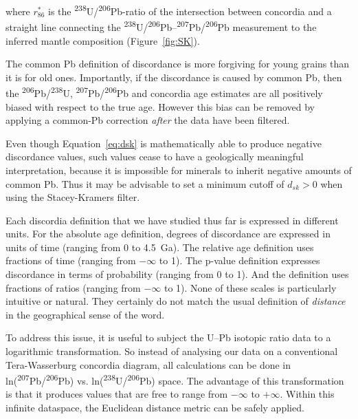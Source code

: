 \documentclass[gchron, manuscript]{copernicus}
\begin{document}
\noindent where $r_{86}^\ast$ is the
\textsuperscript{238}U/\textsuperscript{206}Pb-ratio of the
intersection between concordia and a straight line connecting the
\textsuperscript{238}U/\textsuperscript{206}Pb--\textsuperscript{207}Pb/\textsuperscript{206}Pb
measurement to the inferred mantle composition (Figure~\ref{fig:SK}).

The common Pb definition of discordance is more forgiving for young
grains than it is for old ones. Importantly, if the discordance is
caused by common Pb, then the
\textsuperscript{206}Pb/\textsuperscript{238}U,
\textsuperscript{207}Pb/\textsuperscript{206}Pb and concordia age
estimates are all positively biased with respect to the true
age. However this bias can be removed by applying a common-Pb
correction \emph{after} the data have been filtered.

Even though Equation~\ref{eq:dsk} is mathematically able to produce
negative discordance values, such values cease to have a geologically
meaningful interpretation, because it is impossible for minerals to
inherit negative amounts of common Pb. Thus it may be advisable to set
a minimum cutoff of $d_{sk}>0$ when using the Stacey-Kramers filter.

Each discordia definition that we have studied thus far is expressed
in different units. For the absolute age definition, degrees of
discordance are expressed in units of time (ranging from 0 to
4.5~Ga). The relative age definition uses fractions of time (ranging
from $-\infty$ to 1). The p-value definition expresses discordance in
terms of probability (ranging from 0 to 1). And the \citet{stacey1975}
definition uses fractions of ratios (ranging from $-\infty$ to
1). None of these scales is particularly intuitive or natural. They
certainly do not match the usual definition of \emph{distance} in the
geographical sense of the word.

To address this issue, it is useful to subject the U--Pb isotopic
ratio data to a logarithmic transformation. So instead of analysing
our data on a conventional Tera-Wasserburg concordia diagram, all
calculations can be done in
ln(\textsuperscript{207}Pb/\textsuperscript{206}Pb) vs.
ln(\textsuperscript{238}U/\textsuperscript{206}Pb) space. The
advantage of this transformation is that it produces values that are
free to range from $-\infty$ to $+\infty$. Within this infinite
dataspace, the Euclidean distance metric can be safely applied.
\end{document}
